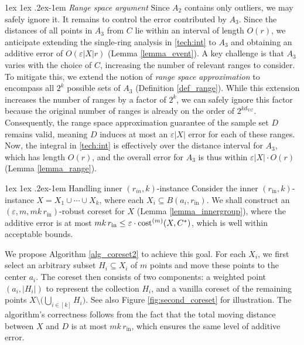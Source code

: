 \documentclass[11pt,letterpaper]{article}
\makeatletter
\renewcommand{\paragraph}{%
  \@startsection{paragraph}{4}%
  {\z@}{1ex \@plus 1ex \@minus .2ex}{-1em}%
  {\normalfont\normalsize\bfseries}%
}
\renewcommand{\subparagraph}{%
	\@startsection{subparagraph}{5}%
	{\parindent}{1ex \@plus 1ex \@minus .2ex}{-1em}%
	{\normalfont\normalsize\bfseries}%
}
\theoremstyle{definition}
\renewcommand{\epsilon}{\varepsilon}
\newcommand{\VC}{\ensuremath{\mathrm{VC}}}
\newcommand{\inn}{{\mathrm{in}}}
\makeatother
\begin{document}
\subparagraph{\em Range space argument} 
Since \(A_2\) contains only outliers, we may safely ignore it. 
%
It remains to control the error contributed by \(A_3\). 
%
Since the distances of all points in \(A_3\) from \(C\) lie within an interval of length \(O(r)\), we anticipate extending the single-ring analysis in \eqref{tech:int} to \(A_3\) and obtaining an additive error of \(O(\epsilon \lvert X\rvert r)\) (Lemma \ref{lemma_event}). 
%
A key challenge is that \(A_3\) varies with the choice of \(C\), increasing the number of relevant ranges to consider.
%
To mitigate this, we extend the notion of \emph{range space approximation} to encompass all \(2^k\) possible sets of \(A_3\) (Definition \ref{def_range}). 
%
While this extension increases the number of ranges by a factor of \(2^k\), we can safely ignore this factor because the original number of ranges is already on the order of \(2^{k d_{\VC}}\).
%
Consequently, the range space approximation guarantee of the sample set \(D\) remains valid, meaning \(D\) induces at most an \(\epsilon |X|\) error for each of these ranges. 
%
Now, the integral in \eqref{tech:int} is effectively over the distance interval for \(A_3\), which has length \(O(r)\), and the overall error for \(A_3\) is thus within \(\epsilon |X| \cdot O(r)\) (Lemma \ref{lemma_range}).

\paragraph{Handling inner $(r_{in},k)$-instance} 
Consider the inner \((r_{\inn},k)\)-instance \(X = X_1 \cup \cdots \cup X_k\), where each \(X_i \subseteq B(a_i, r_{\inn})\). 
%
We shall construct an \((\epsilon, m, mk\,r_{\inn})\)-robust coreset for \(X\) (Lemma \ref{lemma_innergroup}), where the additive error is at most $mk\,r_{\inn} \leq \epsilon \cdot \cost[m](X, C^\ast)$, which is well within acceptable bounds.
%

We propose Algorithm \ref{alg_coreset2} to achieve this goal. 
%
For each \(X_i\), we first select an arbitrary subset \(H_i\subseteq X_i\) of \(m\) points and move these points to the center \(a_i\). 
%
The coreset then consists of two components: a weighted point \((a_i, |H_i|)\) to represent the collection \(H_i\), and a vanilla coreset of the remaining points \(X \setminus \bigl(\bigcup_{i \in [k]} H_i\bigr)\). 
%
See also Figure \ref{fig:second_coreset} for illustration.
%
The algorithm’s correctness follows from the fact that the total moving distance between \(X\) and \(D\) is at most \(m k\,r_{\inn} \), which ensures the same level of additive error.
\end{document}
